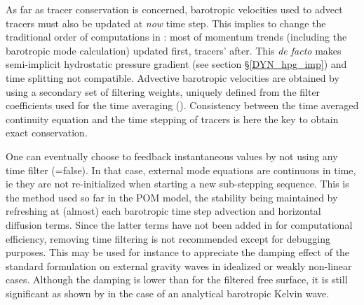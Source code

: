 \documentclass[NEMO_book]{subfiles}
\begin{document}

As far as tracer conservation is concerned, barotropic velocities used to advect tracers must also be updated 
at \textit{now} time step. This implies to change the traditional order of computations in \NEMO: most of momentum  
trends (including the barotropic mode calculation) updated first, tracers' after. This \textit{de facto} makes semi-implicit hydrostatic 
pressure gradient (see section \S\ref{DYN_hpg_imp}) and time splitting not compatible. 
Advective barotropic velocities are obtained by using a secondary set of filtering weights, uniquely defined from the filter 
coefficients used for the time averaging (\citet{Shchepetkin_McWilliams_OM05}). Consistency between the time averaged continuity equation and the time stepping of tracers is here the key to obtain exact conservation.


One can eventually choose to feedback instantaneous values by not using any time filter (=false). 
In that case, external mode equations are continuous in time, ie they are not re-initialized when starting a new 
sub-stepping sequence. This is the method used so far in the POM model, the stability being maintained by refreshing at (almost) 
each barotropic time step advection and horizontal diffusion terms. Since the latter terms have not been added in \NEMO for 
computational efficiency, removing time filtering is not recommended except for debugging purposes. 
This may be used for instance to appreciate the damping effect of the standard formulation on external gravity waves in idealized or weakly non-linear cases. Although the damping is lower than for the filtered free surface, it is still significant as shown by \citet{Levier2007} in the case of an analytical barotropic Kelvin wave.
\end{document}
